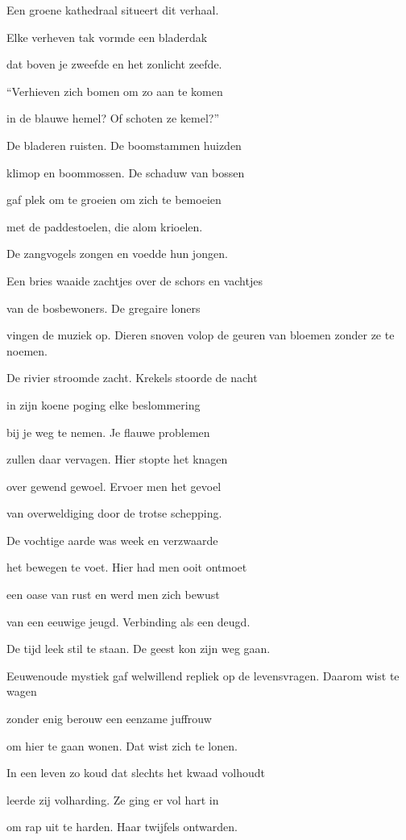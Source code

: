 Een groene kathedraal
situeert dit verhaal.

Elke verheven tak
vormde een bladerdak

dat boven je zweefde
en het zonlicht zeefde.

“Verhieven zich bomen
om zo aan te komen

in de blauwe hemel?
Of schoten ze kemel?”

De bladeren ruisten.
De boomstammen huizden

klimop en boommossen.
De schaduw van bossen

gaf plek om te groeien
om zich te bemoeien

met de paddestoelen,
die alom krioelen.

De zangvogels zongen
en voedde hun jongen.

Een bries waaide zachtjes
over de schors en vachtjes

van de bosbewoners.
De gregaire loners

vingen de muziek op.
Dieren snoven volop
de geuren van bloemen
zonder ze te noemen.

De rivier stroomde zacht. Krekels stoorde de nacht

in zijn koene poging
elke beslommering

bij je weg te nemen.
Je flauwe problemen

zullen daar vervagen.
Hier stopte het knagen

over gewend gewoel.
Ervoer men het gevoel

van overweldiging
door de trotse schepping.

De vochtige aarde
was week en verzwaarde

het bewegen te voet.
Hier had men ooit ontmoet

een oase van rust
en werd men zich bewust

van een eeuwige jeugd.
Verbinding als een deugd.

De tijd leek stil te staan.
De geest kon zijn weg gaan.

Eeuwenoude mystiek
gaf welwillend repliek
op de levensvragen.
Daarom wist te wagen

zonder enig berouw
een eenzame juffrouw

om hier te gaan wonen.
Dat wist zich te lonen.

In een leven zo koud
dat slechts het kwaad volhoudt

leerde zij volharding.
Ze ging er vol hart in

om rap uit te harden.
Haar twijfels ontwarden.


